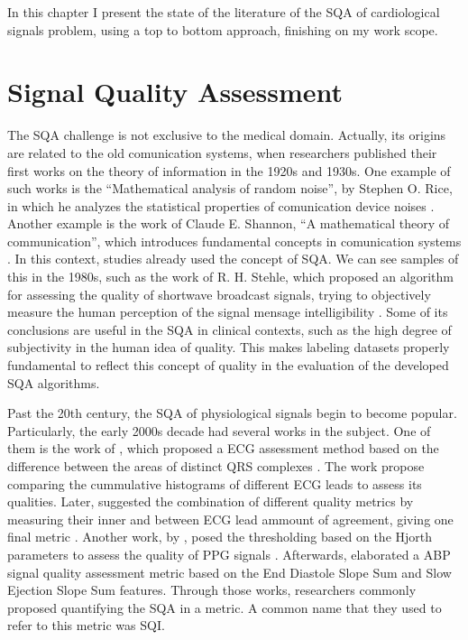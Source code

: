 

In this chapter I present the state of the literature of the \acrlong{SQA} of cardiological signals problem, using a top to bottom approach, finishing on my work scope.

\section{Signal Quality Assessment}

The \acrfull{SQA} challenge is not exclusive to the medical domain. Actually, its origins are related to the old comunication systems, when researchers published their first works on the theory of information in the 1920s and 1930s. One example of such works is the ``Mathematical analysis of random noise'', by Stephen O. Rice, in which he analyzes the statistical properties of comunication device noises \cite{origins-1}. Another example is the work of Claude E. Shannon, ``A mathematical theory of communication'', which introduces fundamental concepts in comunication systems \cite{origins-2}. In this context, studies already used the concept of \acrshort{SQA}. We can see samples of this in the 1980s, such as the work of R. H. Stehle, which proposed an algorithm for assessing the quality of shortwave broadcast signals, trying to objectively measure the human perception of the signal mensage intelligibility \cite{origins-3}. Some of its conclusions are useful in the \acrshort{SQA} in clinical contexts, such as the high degree of subjectivity in the human idea of quality. This makes labeling datasets properly fundamental to reflect this concept of quality in the evaluation of the developed  \acrshort{SQA} algorithms.
	
Past the 20th century, the \acrshort{SQA} of physiological signals begin to become popular. Particularly, the early 2000s decade had several works in the subject. One of them is the work of \citeauthor{2000s-1}, which proposed a \acrshort{ECG} assessment method based on the difference between the areas of distinct QRS complexes \cite{2000s-1}. The work propose comparing the cummulative histograms of different \acrshort{ECG} leads to assess its qualities. Later, \citeauthor{2000s-2} suggested the combination of different quality metrics by measuring their inner and between \acrshort{ECG} lead ammount of agreement, giving one final metric \cite{2000s-2}. Another work, by \citeauthor{2000s-3}, posed the thresholding based on the Hjorth parameters to assess the quality of \acrshort{PPG} signals \cite{2000s-3}. Afterwards, \citeauthor{2000s-4} elaborated a \acrshort{ABP} signal quality assessment metric based on the End Diastole Slope Sum and Slow Ejection Slope Sum features. Through those works, researchers commonly proposed quantifying the \acrshort{SQA} in a metric. A common name that they used to refer to this metric was \acrfull{SQI}. 


